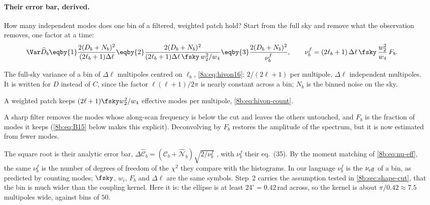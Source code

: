 \paragraph{Their error bar, derived.}
How many independent modes does one bin of a filtered, weighted patch hold?
Start from the full sky and remove what the observation removes, one factor at a time:
\begin{align}
  \Var\widehat D_b
  &\eqby{1}\frac{2(D_b+N_b)^2}{(2\ell_b+1)\Delta\ell}
   \eqby{2}\frac{2(D_b+N_b)^2}{(2\ell_b+1)\Delta\ell\,\fsky\,w_2^2/w_4}
   \eqby{3}\frac{2(D_b+N_b)^2}{\nu^f_b},
  \qquad \nu^f_b=(2\ell_b+1)\,\Delta\ell\,\fsky\,\frac{w_2^2}{w_4}\,F_b .
  \label{8b:eq:hivon-nu}
\end{align}
\begin{explain}
  \item The full-sky variance of a bin of $\Delta\ell$ multipoles centred on $\ell_b$, \eqref{8a:eq:hivon16}: $2/(2\ell+1)$
        per multipole, $\Delta\ell$ independent multipoles. It is written for $D$ instead of $C$, since the factor
        $\ell(\ell+1)/2\pi$ is nearly constant across a bin; $N_b$ is the binned noise on the sky.
  \item A weighted patch keeps $(2\ell+1)\fsky w_2^2/w_4$ effective modes per multipole, \eqref{8b:eq:hivon-count}.
  \item A sharp filter removes the modes whose along-scan frequency is below the cut and leaves the others
        untouched, and $F_b$ is the fraction of modes it keeps (\eqref{8b:eq:B15} below makes this explicit).
        Deconvolving by $F_b$ restores the amplitude of the spectrum, but it is now estimated from fewer modes.
\end{explain}
The square root is their analytic error bar, $\Delta\widehat{\mathcal C}_b=(\mathcal C_b+\widehat{\mathcal N}_b)\sqrt{2/\nu^f_b}$
, with $\nu^f_b$ their eq.~(35). By the moment matching of \eqref{8b:eq:nu-eff}, the same
$\nu^f_b$ is the number of degrees of freedom of the $\chi^2$ they compare with the histograms. In our
language $\nu^f_b$ is the $\nu_{\rm eff}$ of a bin, as predicted by counting modes; $\fsky$, $w_i$, $F_b$ and $\Delta\ell$ are the
same symbols. Step~2 carries the assumption tested in \cref{8b:sec:shape-cut}, that the bin is much
wider than the coupling kernel. Here it is: the ellipse is at least $24^\circ=0.42$\,rad across, so the kernel
is about $\pi/0.42\approx7.5$ multipoles wide, against bins of $50$.

